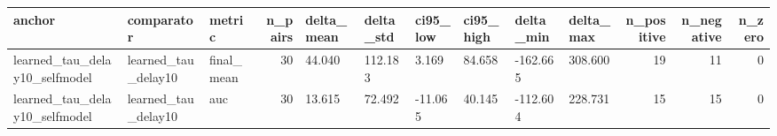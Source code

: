 \begin{tabular}{lllrllllllrrr}
\toprule
anchor & comparator & metric & n_pairs & delta_mean & delta_std & ci95_low & ci95_high & delta_min & delta_max & n_positive & n_negative & n_zero \\
\midrule
learned_tau_delay10_selfmodel & learned_tau_delay10 & final_mean & 30 & 44.040 & 112.183 & 3.169 & 84.658 & -162.665 & 308.600 & 19 & 11 & 0 \\
learned_tau_delay10_selfmodel & learned_tau_delay10 & auc & 30 & 13.615 & 72.492 & -11.065 & 40.145 & -112.604 & 228.731 & 15 & 15 & 0 \\
\bottomrule
\end{tabular}
